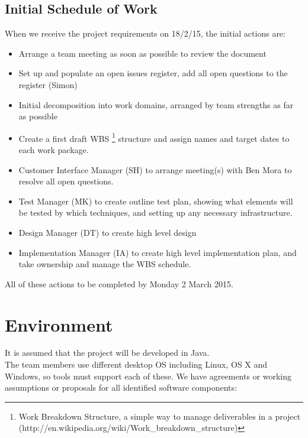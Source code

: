 \documentclass{article}
\begin{document}
\subsection{Initial Schedule of Work}

When we receive the project requirements on 18/2/15, the initial actions are:

\begin{itemize}
  \item Arrange a team meeting as soon as possible to review the document
  \item Set up and populate an open issues register, add all open questions to the register (Simon)
  \item Initial decomposition into work domains, arranged by team strengths as far as possible
  \item Create a first draft WBS \footnote{Work Breakdown Structure, a simple way to manage deliverables in a project (http://en.wikipedia.org/wiki/Work\_breakdown\_structure)} structure and assign names and target dates to each work package.
  \item Customer Interface Manager (SH) to arrange meeting(s) with Ben Mora to resolve all open questions.
  \item Test Manager (MK) to create outline test plan, showing what elements will be tested by which techniques, and setting up any necessary infrastructure.
  \item Design Manager (DT) to create high level design
  \item Implementation Manager (IA) to create high level implementation plan, and take ownership and manage the WBS schedule.
\end{itemize}
All of these actions to be completed by Monday 2 March 2015.
\newpage
\section{Environment}

It is assumed that the project will be developed in Java.
\\
The team members use different desktop OS including Linux, OS X and Windows, so tools must support each of these. We have agreements or working assumptions or proposals for all identified software components:\par
\end{document}
